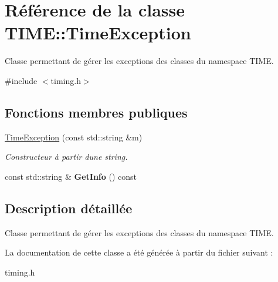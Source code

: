 \hypertarget{class_t_i_m_e_1_1_time_exception}{}\section{Référence de la classe T\+I\+M\+E\+:\+:Time\+Exception}
\label{class_t_i_m_e_1_1_time_exception}


Classe permettant de gérer les exceptions des classes du namespace T\+I\+M\+E.  




{\ttfamily \#include $<$timing.\+h$>$}

\subsection*{Fonctions membres publiques}
\begin{DoxyCompactItemize}
\item 
\hypertarget{class_t_i_m_e_1_1_time_exception_a08502d82065dd79b27cd954b45f4d5c7}{}\hyperlink{class_t_i_m_e_1_1_time_exception_a08502d82065dd79b27cd954b45f4d5c7}{Time\+Exception} (const std\+::string \&m)\label{class_t_i_m_e_1_1_time_exception_a08502d82065dd79b27cd954b45f4d5c7}

\begin{DoxyCompactList}\small\item\em Constructeur à partir d\textquotesingle{}une string. \end{DoxyCompactList}\item 
\hypertarget{class_t_i_m_e_1_1_time_exception_ad86c212253ea1b8654f4cae34611d634}{}const std\+::string \& {\bfseries Get\+Info} () const \label{class_t_i_m_e_1_1_time_exception_ad86c212253ea1b8654f4cae34611d634}

\end{DoxyCompactItemize}


\subsection{Description détaillée}
Classe permettant de gérer les exceptions des classes du namespace T\+I\+M\+E. 

La documentation de cette classe a été générée à partir du fichier suivant \+:\begin{DoxyCompactItemize}
\item 
timing.\+h\end{DoxyCompactItemize}

